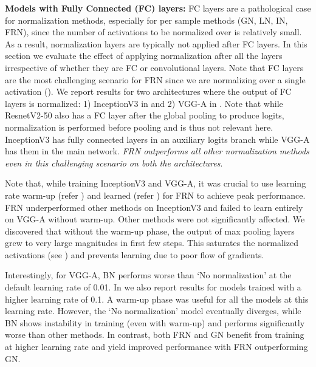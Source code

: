 \documentclass[10pt,twocolumn,letterpaper]{article}
\newcommand{\papername}{FRN}
\newcommand{\batchnorm}{BN}
\begin{document}
\medskip
\noindent
\textbf{Models with Fully Connected (FC) layers:}
FC layers are a pathological case for normalization methods, especially for per sample methods (GN, LN, IN, \papername{}), since the number of activations to be normalized over is relatively small. As a result, normalization layers are typically not applied after FC layers. In this section we evaluate the effect of applying normalization after all the layers irrespective of whether they are FC or convolutional layers.
Note that FC layers are the most challenging scenario for \papername{} since we are normalizing over a single activation (). We report results for two architectures where the output of FC layers is normalized: 1) InceptionV3 in  and 2) VGG-A in . Note that while ResnetV2-50 also has a FC layer after the global pooling to produce logits, normalization is performed before pooling and is thus not relevant here. InceptionV3 has fully connected layers in an auxiliary logits branch while VGG-A has them in the main network. \emph{\papername{} outperforms all other normalization methods even in this challenging scenario on both the architectures}.

Note that, while training InceptionV3 and VGG-A, it was crucial to use learning rate warm-up (refer ) and learned  (refer ) for \papername{} to achieve peak performance. \papername{} underperformed other methods on InceptionV3 and failed to learn entirely on VGG-A without warm-up. Other methods were not significantly affected.
We discovered that without the warm-up phase, the output of max pooling layers grew to very large magnitudes in first few steps. This saturates the normalized activations (see ) and prevents learning due to poor flow of gradients.

Interestingly, for VGG-A, \batchnorm{} performs worse than `No normalization' at the default learning rate of 0.01. In  we also report results for models trained with a higher learning rate of 0.1. A warm-up phase was useful for all the models at this learning rate. However, the `No normalization' model eventually diverges, while \batchnorm{} shows instability in training (even with warm-up) and performs significantly worse than other methods. In contrast, both \papername{} and GN benefit from training at higher learning rate and yield improved performance with \papername{} outperforming GN.
\end{document}
